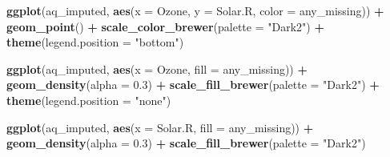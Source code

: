 \documentclass[]{article}
\newenvironment{Shaded}{\begin{snugshade}}{\end{snugshade}}
\newcommand{\DataTypeTok}[1]{\textcolor[rgb]{0.13,0.29,0.53}{#1}}
\newcommand{\FloatTok}[1]{\textcolor[rgb]{0.00,0.00,0.81}{#1}}
\newcommand{\KeywordTok}[1]{\textcolor[rgb]{0.13,0.29,0.53}{\textbf{#1}}}
\newcommand{\NormalTok}[1]{#1}
\newcommand{\OperatorTok}[1]{\textcolor[rgb]{0.81,0.36,0.00}{\textbf{#1}}}
\newcommand{\StringTok}[1]{\textcolor[rgb]{0.31,0.60,0.02}{#1}}
\theoremstyle{definition}
\theoremstyle{definition}
\theoremstyle{definition}
\theoremstyle{remark}
\begin{document}
\begin{Shaded}
\begin{Highlighting}[]
\KeywordTok{ggplot}\NormalTok{(aq_imputed,}
       \KeywordTok{aes}\NormalTok{(}\DataTypeTok{x =}\NormalTok{ Ozone,}
           \DataTypeTok{y =}\NormalTok{ Solar.R,}
           \DataTypeTok{color =}\NormalTok{ any_missing)) }\OperatorTok{+}\StringTok{ }
\StringTok{  }\KeywordTok{geom_point}\NormalTok{() }\OperatorTok{+}
\StringTok{  }\KeywordTok{scale_color_brewer}\NormalTok{(}\DataTypeTok{palette =} \StringTok{"Dark2"}\NormalTok{) }\OperatorTok{+}
\StringTok{  }\KeywordTok{theme}\NormalTok{(}\DataTypeTok{legend.position =} \StringTok{"bottom"}\NormalTok{)}

\KeywordTok{ggplot}\NormalTok{(aq_imputed,}
       \KeywordTok{aes}\NormalTok{(}\DataTypeTok{x =}\NormalTok{ Ozone,}
           \DataTypeTok{fill =}\NormalTok{ any_missing)) }\OperatorTok{+}\StringTok{ }
\StringTok{  }\KeywordTok{geom_density}\NormalTok{(}\DataTypeTok{alpha =} \FloatTok{0.3}\NormalTok{) }\OperatorTok{+}\StringTok{ }
\StringTok{  }\KeywordTok{scale_fill_brewer}\NormalTok{(}\DataTypeTok{palette =} \StringTok{"Dark2"}\NormalTok{) }\OperatorTok{+}
\StringTok{  }\KeywordTok{theme}\NormalTok{(}\DataTypeTok{legend.position =} \StringTok{"none"}\NormalTok{)}

\KeywordTok{ggplot}\NormalTok{(aq_imputed,}
       \KeywordTok{aes}\NormalTok{(}\DataTypeTok{x =}\NormalTok{ Solar.R,}
           \DataTypeTok{fill =}\NormalTok{ any_missing)) }\OperatorTok{+}\StringTok{ }
\StringTok{  }\KeywordTok{geom_density}\NormalTok{(}\DataTypeTok{alpha =} \FloatTok{0.3}\NormalTok{) }\OperatorTok{+}\StringTok{ }
\StringTok{  }\KeywordTok{scale_fill_brewer}\NormalTok{(}\DataTypeTok{palette =} \StringTok{"Dark2"}\NormalTok{)}
\end{Highlighting}
\end{Shaded}
\end{document}
